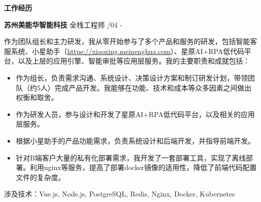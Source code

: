 \documentclass[a4paper]{article}
\newenvironment{changemargin}[2]{%
  \begin{list}{}{%
    \setlength{\topsep}{0pt}%
    \setlength{\leftmargin}{#1}%
    \setlength{\rightmargin}{#2}%
    \setlength{\listparindent}{\parindent}%
    \setlength{\itemindent}{\parindent}%
    \setlength{\parsep}{\parskip}%
  }%
  \item[]}{\end{list}
}
\newcommand{\lineover}{
	\begin{changemargin}{-0.05in}{-0.05in}
		\vspace*{-8pt}
		\hrulefill \\
		\vspace*{-2pt}
	\end{changemargin}
}
\newcommand{\header}[1]{
	\begin{changemargin}{-0.5in}{-0.5in}
	\fontsize{12}{14} \scshape{\textbf{#1}}\\
	\end{changemargin}
}
\newenvironment{body} {
	\vspace*{-16pt}
	\begin{changemargin}{-0.5in}{-0.5in}
  }	
	{\end{changemargin}
}
\begin{document}
\header{工作经历}
\begin{body}
	\vspace{14pt}
	\textbf{苏州美能华智能科技} \hfill 全栈工程师 {/04 - }\\
	\smallskip
	\begin{justify}
	作为团队组长和主力研发，我从零开始参与了多个产品和服务的研发，包括智能客服系统、小星助手（\url{https://xiaoxing.meinenghua.com}）、星原AI+RPA低代码平台，以及上层的应用引擎、智能审批等应用层服务。我的主要职责和成就包括：
	\end{justify}
	\vspace*{-2pt}
	\begin{itemize} \itemsep -0pt  %
		\item 作为组长，负责需求沟通、系统设计、决策设计方案和制订研发计划，带领团队（约5人）完成产品开发。我能够在功能、技术和成本等众多因素之间做出权衡和取舍。\\
	\end{itemize}
	\vspace*{-10pt}
	\begin{itemize} \itemsep -0pt  %
		\item 作为研发人员，参与设计和开发了星原AI+RPA低代码平台，以及相关的应用层服务。\\
	\end{itemize}
	\vspace*{-10pt}
	\begin{itemize} \itemsep -0pt  %
		\item 根据小星助手的产品功能需求，负责系统设计和后端开发，并指导前端开发。\\
	\end{itemize}
	\vspace*{-10pt}
	\begin{itemize} \itemsep -0pt  %
		\item 针对B端客户大量的私有化部署需求，我开发了一套部署工具，实现了离线部署。利用nginx等服务，提高了部署docker镜像的适用性，降低了前端代码配置文件的复杂度。\\
	\end{itemize}	
	\vspace*{-4pt}
	涉及技术：{\fontarial Vue.js, Node.js, PostgreSQL, Redis, Nginx, Docker, Kubernetes}\\


\end{body}
\end{document}
